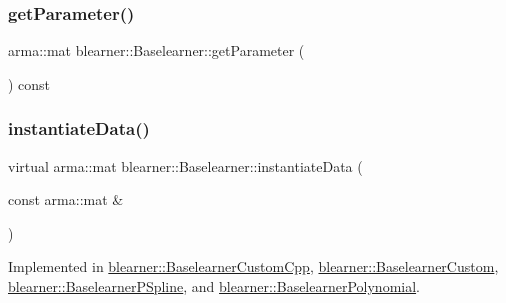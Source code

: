 \mbox{\label{classblearner_1_1_baselearner_a3362fe72e1b653ec3664cae2397414ed}} 
\subsubsection{\texorpdfstring{get\+Parameter()}{getParameter()}}
{\footnotesize\ttfamily arma\+::mat blearner\+::\+Baselearner\+::get\+Parameter (\begin{DoxyParamCaption}{ }\end{DoxyParamCaption}) const}

\mbox{\label{classblearner_1_1_baselearner_af01f1b8c4540927705ff79c3649489f7}} 
\subsubsection{\texorpdfstring{instantiate\+Data()}{instantiateData()}}
{\footnotesize\ttfamily virtual arma\+::mat blearner\+::\+Baselearner\+::instantiate\+Data (\begin{DoxyParamCaption}\item[{const arma\+::mat \&}]{ }\end{DoxyParamCaption})\hspace{0.3cm}{\ttfamily [pure virtual]}}



Implemented in \mbox{\hyperlink{classblearner_1_1_baselearner_custom_cpp_ae130d3b469eff32c8e0be12d925cf88f}{blearner\+::\+Baselearner\+Custom\+Cpp}}, \mbox{\hyperlink{classblearner_1_1_baselearner_custom_a83c25e681bb606ae4a36c249a36229b9}{blearner\+::\+Baselearner\+Custom}}, \mbox{\hyperlink{classblearner_1_1_baselearner_p_spline_a1a83493d31e14f7e28d0aba40a3f4396}{blearner\+::\+Baselearner\+P\+Spline}}, and \mbox{\hyperlink{classblearner_1_1_baselearner_polynomial_aacd6ba3b09ccf63a96d7bffa1d703710}{blearner\+::\+Baselearner\+Polynomial}}.

\mbox{\label{classblearner_1_1_baselearner_ab37986047db43c84420fef2cef7fc20d}} 
